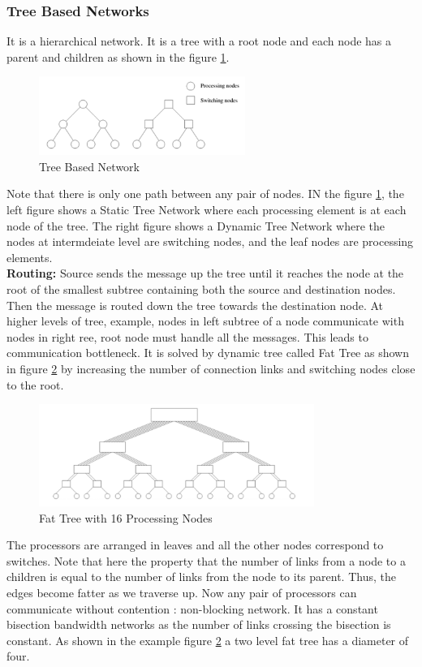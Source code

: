 \documentclass[12pt]{article}
\begin{document}
\subsubsection{Tree Based Networks}
It is a hierarchical network. It is a tree with a root node and each node has a parent and children
as shown in the figure \ref{fig:tree}.
\begin{figure}[H]
    \centering
    \includegraphics[width=0.6\textwidth]{images/tree.png}
    \caption{Tree Based Network}
    \label{fig:tree}
\end{figure}
Note that there is only one path between any pair of nodes.
IN the figure \ref{fig:tree}, the left figure shows a Static Tree Network where each processing element is at 
each node of the tree. The right figure shows a Dynamic Tree Network where the nodes at intermdeiate level
are switching nodes, and the leaf nodes are processing elements.\\
\textbf{Routing: }Source sends the message up the tree until it reaches the node at the root of the smallest subtree containing both the 
source and destination nodes. Then the message is routed down the tree towards the destination node.
At higher levels of tree, example, nodes in left subtree of a node communicate with nodes in right ree, root node must handle all the messages. This leads to
communication bottleneck. It is solved by dynamic tree called Fat Tree as shown in figure \ref{fig:fattree} by increasing the number of connection links and switching nodes close to the root.
\begin{figure}[H]
    \centering
    \includegraphics[width=0.8\textwidth]{images/fattree.png}
    \caption{Fat Tree with 16 Processing Nodes}
    \label{fig:fattree}
\end{figure}
The processors are arranged in leaves and all the other nodes correspond to switches. Note that here the property that 
the number of links from a node to a children is equal to the number of links from the node to its parent. Thus, the edges become fatter as we traverse up.
Now any pair of processors can communicate without contention : non-blocking network. It has a constant bisection bandwidth networks as 
the number of links crossing the bisection is constant. As shown in the example figure \ref{fig:fattree} a two level fat tree has a diameter of four.
\end{document}
